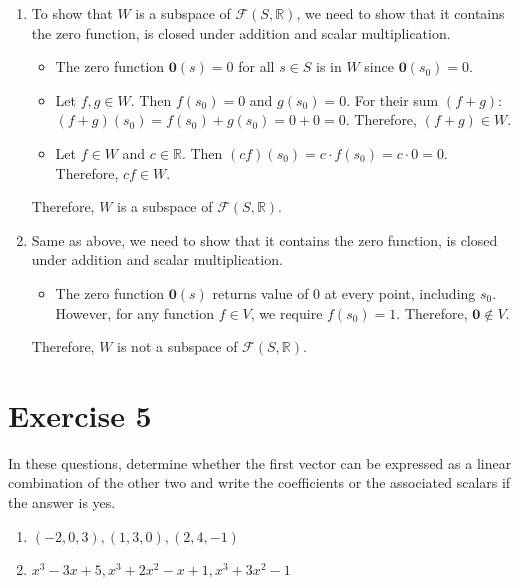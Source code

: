 \documentclass{article}
\begin{document}
\begin{enumerate}[label=(\alph*)]
\item  To show that $W$ is a subspace of $\mathcal{F}(S,\mathbb{R})$, we need to show that it contains the zero function, is closed under addition and scalar multiplication.
\begin{itemize}
\item The zero function $\mathbf{0}(s) = 0$ for all $s \in S$ is in $W$ since $\mathbf{0}(s_0) = 0$.
\item Let $f, g \in W$. Then $f(s_0) = 0$ and $g(s_0) = 0$. For their sum $(f+g)$: $(f+g)(s_0) = f(s_0) + g(s_0) = 0 + 0 = 0$. Therefore, $(f+g) \in W$.
\item Let $f \in W$ and $c \in \mathbb{R}$. Then $(cf)(s_0) = c\cdot f(s_0) = c\cdot 0 = 0$. Therefore, $cf \in W$.
\end{itemize}

Therefore, $W$ is a subspace of $\mathcal{F}(S,\mathbb{R})$.

\item Same as above, we need to show that it contains the zero function, is closed under addition and scalar multiplication.
\begin{itemize}
\item The zero function $\mathbf{0}(s)$ returns value of 0 at every point, including $s_0$. However, for any function $f \in V$, we require $f(s_0) = 1$. Therefore, $\mathbf{0} \notin V$.
\end{itemize}

Therefore, $W$ is not a subspace of $\mathcal{F}(S,\mathbb{R})$.

\end{enumerate}

\newpage

\section*{Exercise 5}
In these questions, determine whether the first vector can be expressed as a linear combination of the other two and write the coefficients or the associated scalars if the answer is yes.
\begin{enumerate}[label=(\alph*)]
\item $(-2,0,3),(1,3,0),(2,4,-1)$
\item $x^3 - 3x + 5, x^3 + 2x^2 - x + 1, x^3 + 3x^2 - 1$
\end{enumerate}
\end{document}
